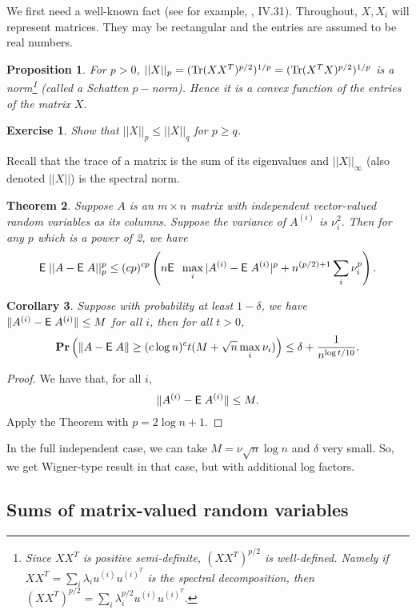 \documentclass{book}
\newtheorem{theorem}{Theorem}[chapter]
\newtheorem{corollary}[theorem]{Corollary}
\newtheorem{proposition}[theorem]{Proposition}
\newtheorem{exercise}{Exercise}
\numberwithin{exercise}{chapter}
\begin{document}
{We first need a well-known fact (see for example, \cite{Bhatia},
IV.31). Throughout, $X,X_i$ will represent matrices. They may be
rectangular and the entries are assumed to be real numbers.

\begin{proposition}\label{fact1}
For $p>0$, $||X||_p = (\hbox{Tr}
(XX^T)^{p/2})^{1/p}=(\hbox{Tr} (X^TX)^{p/2})^{1/p}$ is a norm\footnote{
Since $XX^T$ is positive semi-definite, $(XX^T)^{p/2}$ is
well-defined. Namely if $XX^T=\sum_i\lambda_iu^{(i)}u^{(i)^T}$ is
the spectral decomposition, then
$(XX^T)^{p/2}=\sum_i\lambda_i^{p/2}u^{(i)}u^{(i)^T}.$} (called a
Schatten $p-$norm). Hence it is a convex function of the entries
of the matrix $X$.
\end{proposition}

\begin{exercise}
Show that $||X||_p\leq ||X||_q$ for $p\geq q$.
\end{exercise}

Recall that the trace of a matrix is the sum of its eigenvalues and
$||X||_\infty$ (also denoted $||X||$) is the spectral norm.

\begin{theorem}\label{limindep}
Suppose $A$ is an $m\times n$ matrix with independent
vector-valued random variables as its columns. Suppose the
variance of $A^{(i)}$ is $\nu_i^2$. Then for any $p$  which is a power of
2, we have
$$ \hbox{{\sf E}\;}||A-\hbox{{\sf E}\;} A||_p^p\leq (cp)^{cp}
  \left( n\hbox{{\sf E}\;}\;  \max_i|A^{(i)}-\hbox{{\sf E}\;} A^{(i)}|^p+n^{(p/2)+1}\sum_i\nu_i^{p}\right).$$
\end{theorem}

\begin{corollary}
Suppose with probability at least $1-\delta$, we have
$\|A^{(i)}-\hbox{{\sf E}\;} A^{(i)}\|\leq M$ for all $i$, then for all $t>0$,
$$\mbox{{\bf Pr}}\left( \|A-\hbox{{\sf E}\;} A\|\geq (c\log n)^{c}t(M+\sqrt n\max_i\nu_i)\right)\leq
\delta+ \frac{1}{n^{\log t/10}}.$$
\end{corollary}

\begin{proof}
We have that, for all $i$,
\[
\|A^{(i)}-\hbox{{\sf E}\;} A^{(i)}\|\leq M.
\]
Apply
the Theorem with $p=2\log n+1$.
\end{proof}

In the full independent case, we can take $M=\nu\sqrt n\log n$ and $\delta$ very small.
So, we get Wigner-type result in that case, but with additional log factors.

\subsection{Sums of matrix-valued random variables}

}
\end{document}

